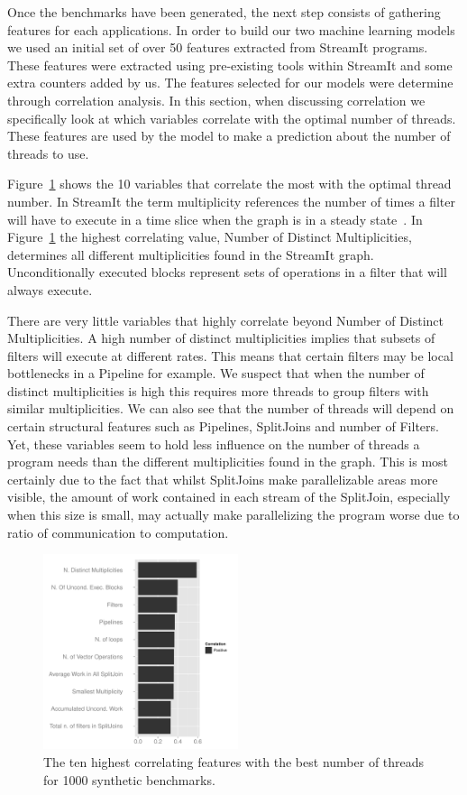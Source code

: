 Once the benchmarks have been generated, the next step consists of gathering features for each applications.
In order to build our two machine learning models we used an initial set of over 50 features extracted from StreamIt programs.
These features were extracted using pre-existing tools within StreamIt and some extra counters added by us.
The features selected for our models were determine through correlation analysis.
In this section, when discussing correlation we specifically look at which variables correlate with the optimal number of threads.
These features are used by the model to make a prediction about the number of threads to use.

Figure~\ref{fig:corr} shows the 10 variables that correlate the most with the optimal thread number.
In StreamIt the term multiplicity references the number of times a filter will have to execute in a time slice when the graph is in a steady state~\cite{gordon2002streamcomp}.
In Figure~\ref{fig:corr} the highest correlating value, Number of Distinct Multiplicities, determines all different multiplicities found in the StreamIt graph.
Unconditionally executed blocks represent sets of operations in a filter that will always execute.

There are very little variables that highly correlate beyond Number of Distinct Multiplicities.
A high number of distinct multiplicities implies that subsets of filters will execute at different rates.
This means that certain filters may be local bottlenecks in a Pipeline for example.
We suspect that when the number of distinct multiplicities is high this requires more threads to group filters with similar multiplicities.
We can also see that the number of threads will depend on certain structural features such as Pipelines, SplitJoins and number of Filters.
Yet, these variables seem to hold less influence on the number of threads a program needs than the different multiplicities found in the graph.
This is most certainly due to the fact that whilst SplitJoins make parallelizable areas more visible, the amount of work contained in each stream of the SplitJoin, especially when this size is small, may actually make parallelizing the program worse due to ratio of communication to computation.

\begin{figure}
  \includegraphics[width=0.51\textwidth]{streamit-paper/graphics/corrGraph.pdf}
  \caption{The ten highest correlating features with the best number of threads for 1000 synthetic benchmarks.}\label{fig:corr}
\vspace{4mm}
\end{figure}

